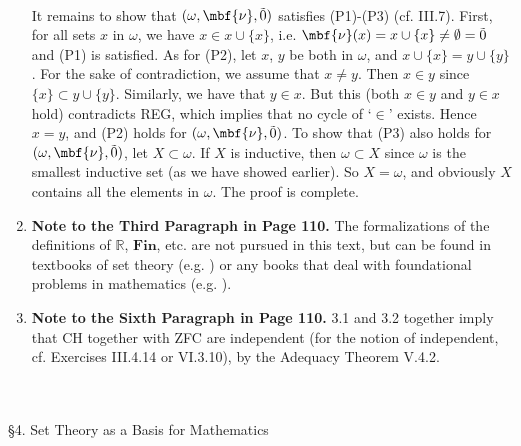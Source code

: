 \begin{enumerate}[1.]
\\
It remains to show that $(\omega, \mbf{\nu}, \tilde{0})$ satisfies (P1)-(P3) (cf. III.7). First, for all sets $x$ in $\omega$, we have $x \in x \cup \{ x \}$, i.e. $\mbf{\nu}(x) = x \cup \{ x \} \neq \emptyset = \tilde{0}$ and (P1) is satisfied. As for (P2), let $x$, $y$ be both in $\omega$, and $x \cup \{ x \} = y \cup \{ y \}$. For the sake of contradiction, we assume that $x \neq y$. Then $x \in y$ since $\{ x \} \subset y \cup \{ y \}$. Similarly, we have that $y \in x$. But this (both $x \in y$ and $y \in x$ hold) contradicts REG, which implies that no cycle of `$\in$' exists. Hence $x = y$, and (P2) holds for $(\omega, \mbf{\nu}, \tilde{0})$. To show that (P3) also holds for $(\omega, \mbf{\nu}, \tilde{0})$, let $X \subset \omega$. If $X$ is inductive, then $\omega \subset X$ since $\omega$ is the smallest inductive set (as we have showed earlier). So $X = \omega$, and obviously $X$ contains all the elements in $\omega$. The proof is complete. 
%
\item \textbf{Note to the Third Paragraph in Page 110.} The formalizations of the definitions of $\mathbb{R}$, $\mathbf{Fin}$, etc. are not pursued in this text, but can be found in textbooks of set theory (e.g. \cite{Thomas_Jech}) or any books that deal with foundational problems in mathematics  (e.g. \cite{Edmund_Landau}).
%
\item \textbf{Note to the Sixth Paragraph in Page 110.} 3.1 and 3.2 together imply that CH together with ZFC are independent (for the notion of independent, cf. Exercises III.4.14 or VI.3.10), by the Adequacy Theorem V.4.2.
\end{enumerate}
\ 
\\
\\
{\large \S4. Set Theory as a Basis for Mathematics}
